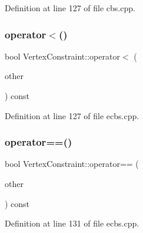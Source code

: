 Definition at line 127 of file cbs.\+cpp.

\mbox{\label{struct_vertex_constraint_a7c3dc8c528e5047776be956697979552}} 
\subsubsection{\texorpdfstring{operator$<$()}{operator<()}\hspace{0.1cm}{\footnotesize\ttfamily [2/2]}}
{\footnotesize\ttfamily bool Vertex\+Constraint\+::operator$<$ (\begin{DoxyParamCaption}\item[{const \hyperlink{struct_vertex_constraint}{Vertex\+Constraint} \&}]{other }\end{DoxyParamCaption}) const\hspace{0.3cm}{\ttfamily [inline]}}



Definition at line 127 of file ecbs.\+cpp.

\mbox{\label{struct_vertex_constraint_aa1479e4f7de0f75536f144d224661f4b}} 
\subsubsection{\texorpdfstring{operator==()}{operator==()}\hspace{0.1cm}{\footnotesize\ttfamily [1/2]}}
{\footnotesize\ttfamily bool Vertex\+Constraint\+::operator== (\begin{DoxyParamCaption}\item[{const \hyperlink{struct_vertex_constraint}{Vertex\+Constraint} \&}]{other }\end{DoxyParamCaption}) const\hspace{0.3cm}{\ttfamily [inline]}}



Definition at line 131 of file ecbs.\+cpp.

\mbox{\label{struct_vertex_constraint_aa1479e4f7de0f75536f144d224661f4b}} 
